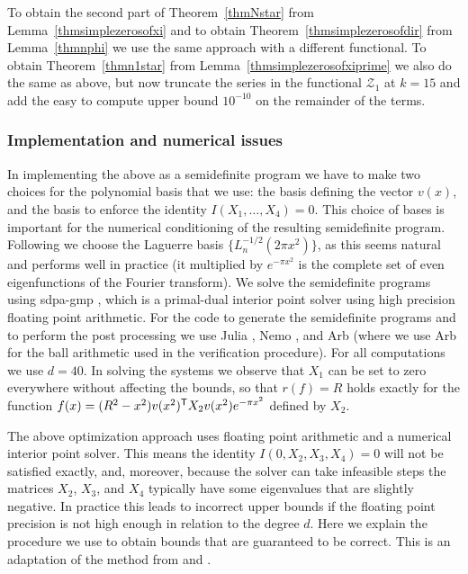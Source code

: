 \documentclass[reqno]{amsart}
\newcommand{\Z}{\mathcal{Z}}
\begin{document}
To obtain the second part of Theorem~\ref{thmNstar} from Lemma~\ref{thmsimplezerosofxi} and to obtain Theorem~\ref{thmsimplezerosofdir} from Lemma~\ref{thmnphi} we use the same approach with a different functional. To obtain Theorem~\ref{thmn1star} from Lemma~\ref{thmsimplezerosofxiprime} we also do the same as above, but now truncate the series in the functional $\Z_{1}$ at $k=15$ and add the easy to compute upper bound $10^{-10}$ on the remainder of the terms.

\subsubsection{Implementation and numerical issues} \label{sec:rig}  In implementing the above as a semidefinite program we have to make two choices for the polynomial basis that we use: the basis defining the vector $v(x)$, and the basis to enforce the identity $I(X_1,\ldots,X_4) = 0$. This choice of bases is important for the numerical conditioning of the resulting semidefinite program. Following \cite{dLOV} we choose the Laguerre basis $\{L_n^{-1/2}(2\pi x^2)\}$, as this seems natural and performs well in practice (it multiplied by $e^{-\pi x^2}$ is the complete set of even eigenfunctions of the Fourier transform). We solve the semidefinite programs using sdpa-gmp \cite{Nakata}, which is a primal-dual interior point solver using high precision floating point arithmetic. For the code to generate the semidefinite programs and to perform the post processing we use Julia \cite{BEKV}, Nemo \cite{FHHJ}, and Arb \cite{J} (where we use Arb for the ball arithmetic used in the verification procedure). For all computations we use $d=40$. In solving the systems we observe that $X_1$ can be set to zero everywhere without affecting the bounds, so that $r(f) = R$ holds exactly for the function $f(x) = (R^2 - x^2) v(x^2)^{\sf T} X_2 v(x^2) e^{-\pi x^2}$ defined by $X_2$. 

The above optimization approach uses floating point arithmetic and a numerical interior point solver. This means the identity $I(0, X_2, X_3, X_4) = 0$ will not be satisfied exactly, and, moreover, because the solver can take infeasible steps the matrices $X_2$, $X_3$, and $X_4$ typically have some eigenvalues that are slightly negative. In practice this leads to incorrect upper bounds if the floating point precision is not high enough in relation to the degree $d$. Here we explain the procedure we use to obtain bounds that are guaranteed to be correct. This is an adaptation of the method from  \cite{Lo} and \cite{dLOV}. 
\end{document}
